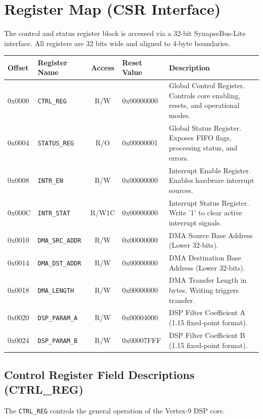 \section{Register Map (CSR Interface)}
The control and status register block is accessed via a 32-bit SynapseBus-Lite interface. All registers are 32 bits wide and aligned to 4-byte boundaries.

\noindent
\begin{tabularx}{\textwidth}{l l c l X}
\toprule
\textbf{Offset} & \textbf{Register Name} & \textbf{Access} & \textbf{Reset Value} & \textbf{Description} \\
\midrule
0x0000 & \texttt{CTRL\_REG} & R/W & 0x00000000 & Global Control Register. Controls core enabling, resets, and operational modes. \\
0x0004 & \texttt{STATUS\_REG} & R/O & 0x00000001 & Global Status Register. Exposes FIFO flags, processing status, and errors. \\
0x0008 & \texttt{INTR\_EN} & R/W & 0x00000000 & Interrupt Enable Register. Enables hardware interrupt sources. \\
0x000C & \texttt{INTR\_STAT} & R/W1C & 0x00000000 & Interrupt Status Register. Write '1' to clear active interrupt signals. \\
0x0010 & \texttt{DMA\_SRC\_ADDR} & R/W & 0x00000000 & DMA Source Base Address (Lower 32-bits). \\
0x0014 & \texttt{DMA\_DST\_ADDR} & R/W & 0x00000000 & DMA Destination Base Address (Lower 32-bits). \\
0x0018 & \texttt{DMA\_LENGTH} & R/W & 0x00000000 & DMA Transfer Length in bytes. Writing triggers transfer. \\
0x0020 & \texttt{DSP\_PARAM\_A} & R/W & 0x00004000 & DSP Filter Coefficient A (1.15 fixed-point format). \\
0x0024 & \texttt{DSP\_PARAM\_B} & R/W & 0x00007FFF & DSP Filter Coefficient B (1.15 fixed-point format). \\
\bottomrule
\end{tabularx}

\subsection{Control Register Field Descriptions (CTRL\_REG)}
The \texttt{CTRL\_REG} controls the general operation of the Vertex-9 DSP core.

